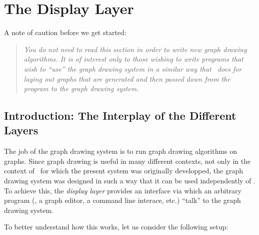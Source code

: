 %
%
%


\section{The Display Layer}

{}


\label{section-gd-display-layer}

A note of caution before we get started:

\begin{quote}
  \itshape You do not need to read this section in order to write new
  graph drawing algorithms. It is of interest only to those wishing to
  write programs that wish to ``use'' the graph drawing system in a
  similar way that \tikzname\ does for laying out graphs that are
  generated and then passed down from the program to the graph drawing
  system.
\end{quote}


\subsection{Introduction: The Interplay of the Different Layers}

The job of the graph drawing system is to run graph drawing algorithms
on graphs. Since graph drawing is useful in many different contexts,
not only in the context of \tikzname\ for which the present system was
originally developped, the graph drawing system was designed in such a
way that it can be used independently of \tikzname. To achieve this,
the \emph{display layer} provides an interface via which an arbitrary
program (\tikzname, a graph editor, a command line interace, etc.)
``talk'' to the graph drawing system.

To better understand how this works, let us consider the following
setup: 

